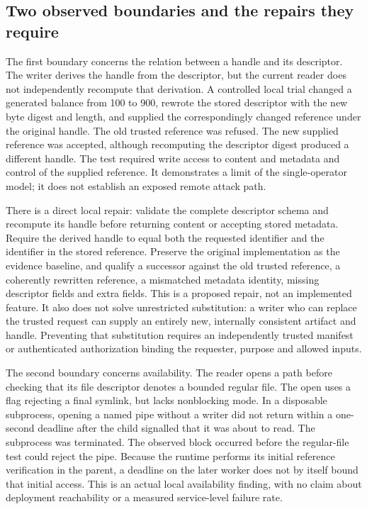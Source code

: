 \hypertarget{two-observed-boundaries-and-the-repairs-they-require}{%
\subsection{Two observed boundaries and the repairs they
require}\label{two-observed-boundaries-and-the-repairs-they-require}}

The first boundary concerns the relation between a handle and its
descriptor. The writer derives the handle from the descriptor, but the
current reader does not independently recompute that derivation. A
controlled local trial changed a generated balance from 100 to 900,
rewrote the stored descriptor with the new byte digest and length, and
supplied the correspondingly changed reference under the original
handle. The old trusted reference was refused. The new supplied
reference was accepted, although recomputing the descriptor digest
produced a different handle. The test required write access to content
and metadata and control of the supplied reference. It demonstrates a
limit of the single-operator model; it does not establish an exposed
remote attack path.~\citep{exec14_custody_observations}

There is a direct local repair: validate the complete descriptor schema
and recompute its handle before returning content or accepting stored
metadata. Require the derived handle to equal both the requested
identifier and the identifier in the stored reference. Preserve the
original implementation as the evidence baseline, and qualify a
successor against the old trusted reference, a coherently rewritten
reference, a mismatched metadata identity, missing descriptor fields and
extra fields. This is a proposed repair, not an implemented feature. It
also does not solve unrestricted substitution: a writer who can replace
the trusted request can supply an entirely new, internally consistent
artifact and handle. Preventing that substitution requires an
independently trusted manifest or authenticated authorization binding
the requester, purpose and allowed inputs. \citep{exec14_custody_design}

The second boundary concerns availability. The reader opens a path
before checking that its file descriptor denotes a bounded regular file.
The open uses a flag rejecting a final symlink, but lacks nonblocking
mode. In a disposable subprocess, opening a named pipe without a writer
did not return within a one-second deadline after the child signalled
that it was about to read. The subprocess was terminated. The observed
block occurred before the regular-file test could reject the pipe.
Because the runtime performs its initial reference verification in the
parent, a deadline on the later worker does not by itself bound that
initial access. This is an actual local availability finding, with no
claim about deployment reachability or a measured service-level failure
rate. \citep{exec14_custody_implementation,exec14_custody_observations}

